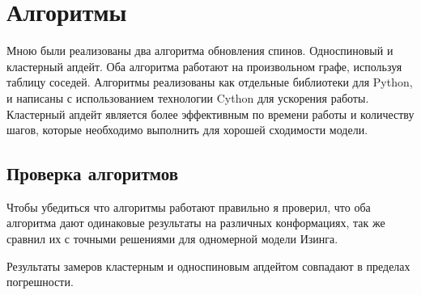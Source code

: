 \section{Алгоритмы}

Мною были реализованы два алгоритма обновления спинов. Односпиновый и кластерный апдейт. Оба алгоритма работают на произвольном графе, используя таблицу соседей. Алгоритмы реализованы как отдельные библиотеки для Python, и написаны с использованием технологии Cython для ускорения работы. Кластерный апдейт является более эффективным по времени работы и количеству шагов, которые необходимо выполнить для хорошей сходимости модели.

\subsection{Проверка алгоритмов}

Чтобы убедиться что алгоритмы работают правильно я проверил, что оба алгоритма дают одинаковые результаты на различных конформациях, так же сравнил их с точными решениями для одномерной модели Изинга.

Результаты замеров кластерным и односпиновым апдейтом совпадают в пределах погрешности.

